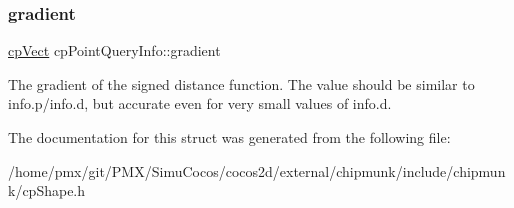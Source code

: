 \subsubsection{\texorpdfstring{gradient}{gradient}}
{\footnotesize\ttfamily \hyperlink{structcpVect}{cp\+Vect} cp\+Point\+Query\+Info\+::gradient}

The gradient of the signed distance function. The value should be similar to info.\+p/info.d, but accurate even for very small values of info.\+d. 

The documentation for this struct was generated from the following file\+:\begin{DoxyCompactItemize}
\item 
/home/pmx/git/\+P\+M\+X/\+Simu\+Cocos/cocos2d/external/chipmunk/include/chipmunk/cp\+Shape.\+h\end{DoxyCompactItemize}
